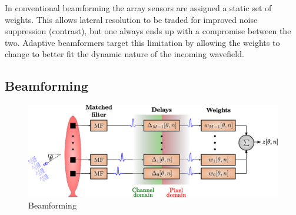 \documentclass[12pt,journal,captionsoff,onecolumn]{IEEEtran}
\let\MYoriglatexcaption\caption               %
\renewcommand{\caption}[2][\relax]{\MYoriglatexcaption[#2]{#2}}
\newcommand\1{\vec 1}
\begin{document}
In conventional beamforming the array sensors are assigned a static set of weights. This allows lateral resolution to be traded for improved noise suppression (contrast), but one always ends up with a compromise between the two. Adaptive beamformers target this limitation by allowing the weights to change to better fit the dynamic nature of the incoming wavefield.

\subsection{Beamforming}

\begin{figure}[!t]\centering
\includegraphics[width=\linewidth]{gfx/beamforming.eps}
\caption{Beamforming}\label{beamforming}
\end{figure}
\end{document}
